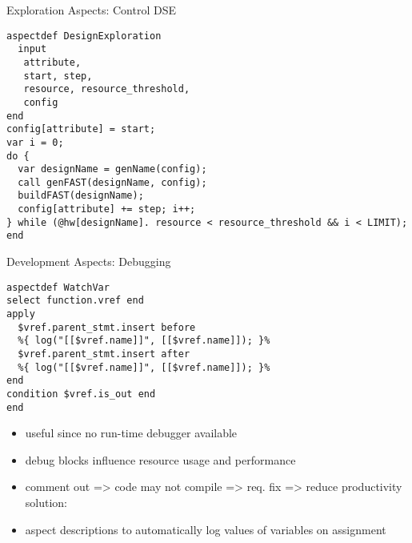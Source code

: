 \begin{frame}[fragile]{Exploration Aspects: Control DSE}
\begin{lstlisting}[label=lst:label, style=lara]
aspectdef DesignExploration
  input
   attribute,
   start, step,
   resource, resource_threshold,
   config
end
config[attribute] = start;
var i = 0;
do {
  var designName = genName(config);
  call genFAST(designName, config);
  buildFAST(designName);
  config[attribute] += step; i++;
} while (@hw[designName]. resource < resource_threshold && i < LIMIT);
end
\end{lstlisting}
\end{frame}

\begin{frame}[fragile]{Development Aspects: Debugging}
\begin{lstlisting}[label=lst:label, style=lara]
aspectdef WatchVar
select function.vref end
apply
  $vref.parent_stmt.insert before
  %{ log("[[$vref.name]]", [[$vref.name]]); }%
  $vref.parent_stmt.insert after
  %{ log("[[$vref.name]]", [[$vref.name]]); }%
end
condition $vref.is_out end
end
\end{lstlisting}

\begin{itemize}
\item useful since no run-time debugger available
\item debug blocks influence resource usage and performance
\item comment out => code may not compile => req. fix => reduce productivity solution:
\item aspect descriptions to automatically log values of variables on assignment
\end{itemize}
\end{frame}
